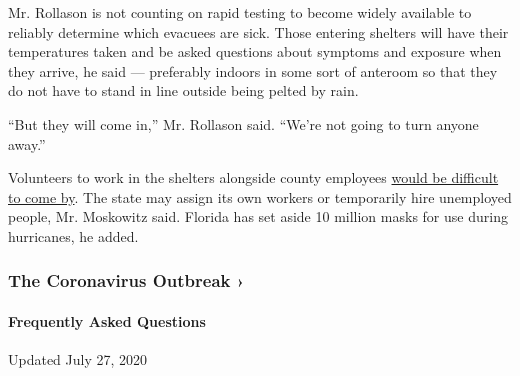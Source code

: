 Mr. Rollason is not counting on rapid testing to become widely available
to reliably determine which evacuees are sick. Those entering shelters
will have their temperatures taken and be asked questions about symptoms
and exposure when they arrive, he said --- preferably indoors in some
sort of anteroom so that they do not have to stand in line outside being
pelted by rain.

``But they will come in,'' Mr. Rollason said. ``We're not going to turn
anyone away.''

Volunteers to work in the shelters alongside county employees
\href{https://www.nytimes.com/2020/05/22/climate/fema-volunteer-disaster-response.html}{would
be difficult to come by}. The state may assign its own workers or
temporarily hire unemployed people, Mr. Moskowitz said. Florida has set
aside 10 million masks for use during hurricanes, he added.

\href{https://www.nytimes.com/news-event/coronavirus?action=click\&pgtype=Article\&state=default\&region=MAIN_CONTENT_3\&context=storylines_faq}{}

\hypertarget{the-coronavirus-outbreak-}{%
\subsubsection{The Coronavirus Outbreak
›}\label{the-coronavirus-outbreak-}}

\hypertarget{frequently-asked-questions}{%
\paragraph{Frequently Asked
Questions}\label{frequently-asked-questions}}

Updated July 27, 2020


